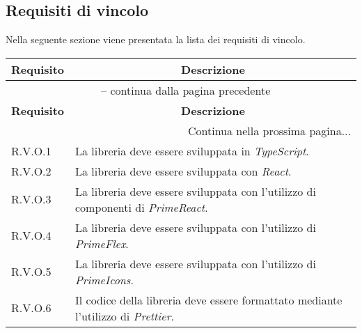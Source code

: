 \subsection{Requisiti di vincolo}
Nella seguente sezione viene presentata la lista dei requisiti di vincolo.

\begin{center}
    \begin{longtable}{|p{2.5cm}|p{10cm}|}
        \hline
        \rowcolor{gray!30}
        \textbf{Requisito} & \multicolumn{1}{c|}{\textbf{Descrizione}}                                                 \\
        \hline
        \endfirsthead
        \hline
        \multicolumn{2}{|c|}{{\tablename\ \thetable{} -- continua dalla pagina precedente}}                            \\
        \hline
        \rowcolor{gray!30}
        \textbf{Requisito} & \multicolumn{1}{c|}{\textbf{Descrizione}}                                                 \\
        \endhead
        \hline
        \multicolumn{2}{|r|}{{Continua nella prossima pagina...}}                                                      \\
        \hline
        \endfoot
        \hline
        \endlastfoot
        \hline
        R.V.O.1            & La libreria deve essere sviluppata in \textit{TypeScript}.                                \\
        \hline
        R.V.O.2            & La libreria deve essere sviluppata con \textit{React}.                                    \\
        \hline
        R.V.O.3            & La libreria deve essere sviluppata con l'utilizzo di componenti di \textit{PrimeReact}.   \\
        \hline
        R.V.O.4            & La libreria deve essere sviluppata con l'utilizzo di \textit{PrimeFlex}.                  \\
        \hline
        R.V.O.5            & La libreria deve essere sviluppata con l'utilizzo di \textit{PrimeIcons}.                 \\
        \hline
        R.V.O.6            & Il codice della libreria deve essere formattato mediante l'utilizzo di \textit{Prettier}. \\
    \end{longtable}
    \label{tab:requisiti_vincolo}
\end{center}
